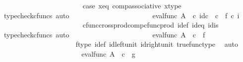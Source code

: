 \begin{isabellebody}
\ \ \ \ \ \ \ \ \ \ \ \ \ \ \ \ \ \ \ \ \ \ \isamarkupfalse%
\ case{}\ x{\isacharunderscore}{\kern0pt}eq\ comp{\isacharunderscore}{\kern0pt}associative{}\ x{\isacharunderscore}{\kern0pt}type\ \isamarkupfalse%
\ {\isacharparenleft}{\kern0pt}typecheck{\isacharunderscore}{\kern0pt}cfuncs{\isacharcomma}{\kern0pt}\ auto{\isacharparenright}{\kern0pt}\isanewline
\ \ \ \ \ \ \ \ \ \ \ \ \ \ \ \ \ \ \isamarkupfalse%
\ \isamarkupfalse%
\ {\isachardoublequoteopen}{\isachardot}{\kern0pt}{\isachardot}{\kern0pt}{\isachardot}{\kern0pt}\ {\isacharequal}{\kern0pt}\ eval{\isacharunderscore}{\kern0pt}func\ A\ {\isasymOmega}\ {\isasymcirc}\isactrlsub c\ {\isasymlangle}id\isactrlsub c\ {\isasymOmega}\ {\isasymcirc}\isactrlsub c\ \ {\isasymt}{\isacharcomma}{\kern0pt}f\ {\isasymcirc}\isactrlsub c\ i{\isasymrangle}{\isachardoublequoteclose}\isanewline
\ \ \ \ \ \ \ \ \ \ \ \ \ \ \ \ \ \ \ \ \ \ \isamarkupfalse%
\ cfunc{\isacharunderscore}{\kern0pt}cross{\isacharunderscore}{\kern0pt}prod{\isacharunderscore}{\kern0pt}comp{\isacharunderscore}{\kern0pt}cfunc{\isacharunderscore}{\kern0pt}prod\ i{\isacharunderscore}{\kern0pt}def\ id{}{\isacharunderscore}{\kern0pt}eq\ id{}{\isacharunderscore}{\kern0pt}is\ \isamarkupfalse%
\ {\isacharparenleft}{\kern0pt}typecheck{\isacharunderscore}{\kern0pt}cfuncs{\isacharcomma}{\kern0pt}\ auto{\isacharparenright}{\kern0pt}\isanewline
\ \ \ \ \ \ \ \ \ \ \ \ \ \ \ \ \ \ \isamarkupfalse%
\ \isamarkupfalse%
\ {\isachardoublequoteopen}{\isachardot}{\kern0pt}{\isachardot}{\kern0pt}{\isachardot}{\kern0pt}\ {\isacharequal}{\kern0pt}\ eval{\isacharunderscore}{\kern0pt}func\ A\ {\isasymOmega}\ {\isasymcirc}\isactrlsub c\ {\isasymlangle}{\isasymt}{\isacharcomma}{\kern0pt}\ f\ {\isasymrangle}{\isachardoublequoteclose}\isanewline
\ \ \ \ \ \ \ \ \ \ \ \ \ \ \ \ \ \ \ \ \isamarkupfalse%
\ f{\isacharunderscore}{\kern0pt}type\ i{\isacharunderscore}{\kern0pt}def\ id{\isacharunderscore}{\kern0pt}left{\isacharunderscore}{\kern0pt}unit{}\ id{\isacharunderscore}{\kern0pt}right{\isacharunderscore}{\kern0pt}unit{}\ true{\isacharunderscore}{\kern0pt}func{\isacharunderscore}{\kern0pt}type\ \isamarkupfalse%
\ auto\isanewline
\ \ \ \ \ \ \ \ \ \ \ \ \ \ \ \ \ \ \isamarkupfalse%
\ \isamarkupfalse%
\ {\isachardoublequoteopen}{\isachardot}{\kern0pt}{\isachardot}{\kern0pt}{\isachardot}{\kern0pt}\ {\isacharequal}{\kern0pt}\ eval{\isacharunderscore}{\kern0pt}func\ A\ {\isasymOmega}\ {\isasymcirc}\isactrlsub c\ {\isasymlangle}{\isasymt}{\isacharcomma}{\kern0pt}\ g{\isasymrangle}{\isachardoublequoteclose}\isanewline

\end{isabellebody}
